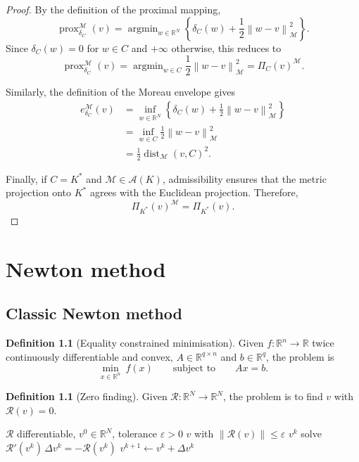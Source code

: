 \documentclass[a4paper,11pt]{book}
\theoremstyle{plain}
\theoremstyle{definition}
\newtheorem{definition}[theorem]{Definition}
\theoremstyle{remark}
\numberwithin{equation}{chapter}
\numberwithin{algorithm}{chapter}
\newcommand{\R}{\mathbb{R}}
\newcommand{\proj}[2]{\Pi_{#2}\!\left(#1\right)}
\newcommand{\norm}[1]{\left\|#1\right\|}
\newcommand{\prox}{\operatorname{prox}}
\DeclareMathOperator{\dist}{dist}
\DeclareMathOperator*{\argmin}{argmin}
\begin{document}
	\begin{proof}
		By the definition of the proximal mapping,
		\[
		\prox_{\delta_C}^{\mathcal M}(v)
		=
		\argmin_{w\in\R^N}
		\left\{
		\delta_C(w)+\frac12\norm{w-v}_{\mathcal M}^2
		\right\}.
		\]
		Since \(\delta_C(w)=0\) for \(w\in C\) and \(+\infty\) otherwise, this reduces
		to
		\[
		\prox_{\delta_C}^{\mathcal M}(v)
		=
		\argmin_{w\in C}
		\frac12\norm{w-v}_{\mathcal M}^2
		=
		\proj{v}{C}^{\mathcal M}.
		\]
		
		Similarly, the definition of the Moreau envelope gives
		\begin{align}
			e_{\delta_C}^{\mathcal M}(v)
			&=
			\inf_{w\in\R^N}
			\left\{
			\delta_C(w)+\frac12\norm{w-v}_{\mathcal M}^2
			\right\}\\
			&=
			\inf_{w\in C}\frac12\norm{w-v}_{\mathcal M}^2\\
			&=
			\frac12\dist_{\mathcal M}(v,C)^2.
		\end{align}
		
		Finally, if \(C=K^*\) and \(\mathcal M\in\mathcal A(K)\), admissibility
		ensures that the metric projection onto \(K^*\) agrees with the Euclidean
		projection. Therefore,
		\[
		\proj{v}{K^*}^{\mathcal M}
		=
		\proj{v}{K^*}.
		\]
	\end{proof}
	
	\chapter{Newton method}
	
	\section{Classic Newton method}
	
	\begin{definition}[Equality constrained minimisation]
		Given $f:\R^n\to\R$ twice continuously differentiable and convex,
		$A\in\R^{q\times n}$ and $b\in\R^{q}$, the problem is
		\begin{equation}
			\min_{x\in\R^n}\ f(x)
			\qquad\text{subject to}\qquad
			Ax=b .
		\end{equation}
	\end{definition}
	
	\begin{definition}[Zero finding]
		Given $\mathcal{R}:\R^N\to\R^N$, the problem is to find $v$ with
		$\mathcal{R}(v)=0$.
	\end{definition}
	
	\begin{algorithm}[H]
		\caption{Newton's method for $\mathcal{R}(v)=0$}
		\begin{algorithmic}[1]
			\Require $\mathcal{R}$ differentiable, $v^0\in\R^N$, tolerance $\varepsilon>0$
			\Ensure $v$ with $\norm{\mathcal{R}(v)}\leq\varepsilon$
			\If{$\norm{\mathcal{R}(v^k)}\leq\varepsilon$} \State \Return $v^k$ \EndIf
			\State solve $\mathcal{R}'(v^k)\,\Delta v^k=-\mathcal{R}(v^k)$
			\State $v^{k+1}\gets v^k+\Delta v^k$
			\EndFor
		\end{algorithmic}
	\end{algorithm}
	
\end{document}
